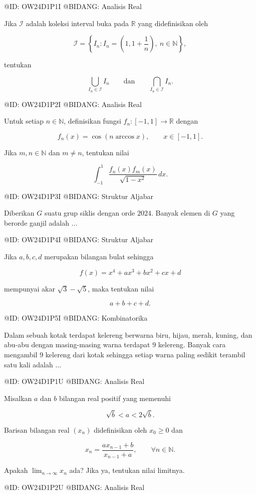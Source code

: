 @ID: OW24D1P1I
@BIDANG: Analisis Real

Jika $\mathcal I$ adalah koleksi interval buka pada $\mathbb R$ yang didefinisikan oleh

$$
\mathcal I=\left\{I_n:I_n=\left(1,1+\frac1n\right),\ n\in\mathbb N\right\},
$$

tentukan

$$
\bigcup_{I_n\in\mathcal I}I_n
\qquad\text{dan}\qquad
\bigcap_{I_n\in\mathcal I}I_n.
$$

@ID: OW24D1P2I
@BIDANG: Analisis Real

Untuk setiap $n\in\mathbb N$, definisikan fungsi $f_n:[-1,1]\to\mathbb R$ dengan

$$
f_n(x)=\cos(n\arccos x),\qquad x\in[-1,1].
$$

Jika $m,n\in\mathbb N$ dan $m\ne n$, tentukan nilai

$$
\int_{-1}^{1}\frac{f_n(x)f_m(x)}{\sqrt{1-x^2}}\,dx.
$$

@ID: OW24D1P3I
@BIDANG: Struktur Aljabar

Diberikan $G$ suatu grup siklis dengan orde $2024$. Banyak elemen di $G$ yang berorde ganjil adalah $\ldots$

@ID: OW24D1P4I
@BIDANG: Struktur Aljabar

Jika $a,b,c,d$ merupakan bilangan bulat sehingga

$$
f(x)=x^4+ax^3+bx^2+cx+d
$$

mempunyai akar $\sqrt3-\sqrt5$, maka tentukan nilai

$$
a+b+c+d.
$$

@ID: OW24D1P5I
@BIDANG: Kombinatorika

Dalam sebuah kotak terdapat kelereng berwarna biru, hijau, merah, kuning, dan abu-abu dengan masing-masing warna terdapat $9$ kelereng. Banyak cara mengambil $9$ kelereng dari kotak sehingga setiap warna paling sedikit terambil satu kali adalah $\ldots$

@ID: OW24D1P1U
@BIDANG: Analisis Real

Misalkan $a$ dan $b$ bilangan real positif yang memenuhi

$$
\sqrt b<a<2\sqrt b.
$$

Barisan bilangan real $(x_n)$ didefinisikan oleh $x_0\ge0$ dan

$$
x_n=\frac{ax_{n-1}+b}{x_{n-1}+a},
\qquad \forall n\in\mathbb N.
$$

Apakah $\displaystyle\lim_{n\to\infty}x_n$ ada? Jika ya, tentukan nilai limitnya.

@ID: OW24D1P2U
@BIDANG: Analisis Real

